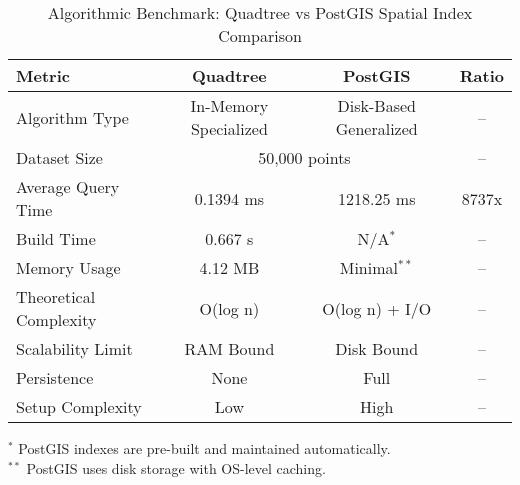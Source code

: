 
\begin{table}[htbp]
\centering
\caption{Algorithmic Benchmark: Quadtree vs PostGIS Spatial Index Comparison}
\label{tab:algorithmic_benchmark}
\begin{tabular}{|l|c|c|c|}
\hline
\textbf{Metric} & \textbf{Quadtree} & \textbf{PostGIS} & \textbf{Ratio} \\
\hline
Algorithm Type & In-Memory Specialized & Disk-Based Generalized & -- \\
\hline
Dataset Size & \multicolumn{2}{c|}{50,000 points} & -- \\
\hline
Average Query Time & 0.1394 ms & 1218.25 ms & 8737x \\
\hline
Build Time & 0.667 s & N/A$^*$ & -- \\
\hline
Memory Usage & 4.12 MB & Minimal$^{**}$ & -- \\
\hline
Theoretical Complexity & O(log n) & O(log n) + I/O & -- \\
\hline
Scalability Limit & RAM Bound & Disk Bound & -- \\
\hline
Persistence & None & Full & -- \\
\hline
Setup Complexity & Low & High & -- \\
\hline
\end{tabular}
\begin{flushleft}
\footnotesize
$^*$ PostGIS indexes are pre-built and maintained automatically.\\
$^{**}$ PostGIS uses disk storage with OS-level caching.
\end{flushleft}
\end{table}
